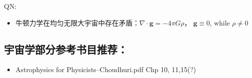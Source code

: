 \documentclass[]{ctexart}
\begin{document}
QN:
\begin{itemize}
    \item 牛顿力学在均匀无限大宇宙中存在矛盾：$\nabla \cdot \mathbf{g}=-4 \pi G \rho$， $\mathbf{g} \equiv 0$, while $\rho \neq 0$ 
\end{itemize}



\subsection{宇宙学部分参考书目推荐：}

\begin{itemize}
    \item Astrophysics for Physicists--Choudhuri.pdf Chp 10, 11,15(?)
\end{itemize}


% 
% 
\end{document}
